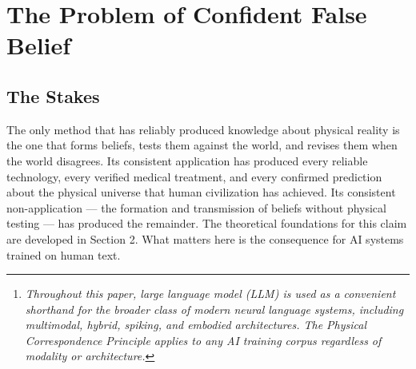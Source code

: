 \documentclass[12pt]{article}
\begin{document}
\begin{abstract}
Large language models\footnote{\emph{Throughout this paper,
  \textquotesingle large language model\textquotesingle{} (LLM) is used
  as a convenient shorthand for the broader class of modern neural
  language systems, including multimodal, hybrid, spiking, and embodied
  architectures. The Physical Correspondence Principle applies to any AI
  training corpus regardless of modality or architecture.}} trained on
human-generated text inherit not only human knowledge but human
epistemic failures --- including mythology, unfalsifiable belief
systems, and culturally inherited narratives presented without
evidential distinction from empirically verified claims. We identify
this structural feature of training corpora as a common causal mechanism
underlying several documented AI failure modes: hallucination,
sycophancy, model collapse, and alignment drift. Drawing on the symbol
grounding literature, information theory, Gödel\textquotesingle s
Incompleteness Theorems reinterpreted as a physicalist argument, and the
neuroscience of reality monitoring, we propose the Physical
Correspondence Principle (PCP) --- the requirement that training content
be categorically labeled according to its epistemic provenance and its
correspondence with physically verified reality. We argue that the PCP
is not merely a philosophical improvement but a practical AI safety
requirement: the engineering analog of the biological reality monitoring
system that evolution developed to keep cognition anchored to the
physical world. The principle accommodates sim-to-real training
environments and does not require grounding to ultimate base reality,
but only to a causally consistent and empirically coherent environment.
Implications for training data curation, system prompt design, and AI
deployment in high-stakes contexts are discussed.
\end{abstract}

\section{The Problem of Confident False Belief}\label{the-problem-of-confident-false-belief}

\subsection{The Stakes}\label{the-stakes}

The only method that has reliably produced knowledge about physical
reality is the one that forms beliefs, tests them against the world, and
revises them when the world disagrees. Its consistent application has
produced every reliable technology, every verified medical treatment,
and every confirmed prediction about the physical universe that human
civilization has achieved. Its consistent non-application --- the
formation and transmission of beliefs without physical testing --- has
produced the remainder. The theoretical foundations for this claim are
developed in Section 2. What matters here is the consequence for AI
systems trained on human text.
\end{document}
